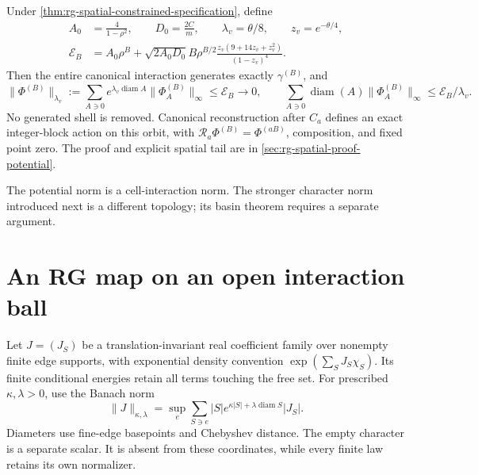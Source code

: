 Under \cref{thm:rg-spatial-constrained-specification}, define
\begin{equation}
 \begin{split}
 A_0&=\frac4{1-\rho^2},\qquad D_0=\frac{2C}{m},\qquad
 \lambda_v=\theta/8,\qquad z_v=e^{-\theta/4},\\
 \mathcal E_B&=A_0\rho^B+\sqrt{2A_0D_0}B\rho^{B/2}
 \frac{z_v(9+14z_v+z_v^2)}{(1-z_v)^4}.
 \end{split}
 \label{eq:rg-spatial-vacuum-bound}
\end{equation}
Then the entire canonical interaction generates exactly
\(\gamma^{(B)}\), and
\begin{equation}
 \|\Phi^{(B)}\|_{\lambda_v}
 :=\sum_{A\ni0}e^{\lambda_v\operatorname{diam}A}
                   \|\Phi_A^{(B)}\|_\infty
 \le\mathcal E_B\longrightarrow0,
 \qquad
 \sum_{A\ni0}\operatorname{diam}(A)\|\Phi_A^{(B)}\|_\infty
 \le\mathcal E_B/\lambda_v.
 \label{eq:rg-spatial-vacuum-norm}
\end{equation}
No generated shell is removed. Canonical reconstruction after \(C_a\) defines
an exact integer-block action on this orbit, with
\(\mathcal R_a\Phi^{(B)}=\Phi^{(aB)}\), composition, and fixed point zero.
The proof and explicit spatial tail are in
\cref{sec:rg-spatial-proof-potential}. 

The potential norm is a cell-interaction norm. The stronger character norm introduced next
is a different topology; its basin theorem requires a separate argument.

\section{An RG map on an open interaction ball}
\label{sec:rg-spatial-open-ball}

Let \(J=(J_S)\) be a translation-invariant real coefficient family over
nonempty finite edge supports, with exponential density convention
\(\exp(\sum_SJ_S\chi_S)\). Its finite conditional energies retain all terms
touching the free set. For prescribed \(\kappa,\lambda>0\), use the Banach norm
\begin{equation}
 \|J\|_{\kappa,\lambda}
 =\sup_e\sum_{S\ni e}|S|e^{\kappa|S|+\lambda\operatorname{diam}S}|J_S|.
 \label{eq:rg-spatial-character-norm}
\end{equation}
Diameters use fine-edge basepoints and Chebyshev distance. The empty character
is a separate scalar. It is absent from these coordinates, while every
finite law retains its own normalizer. 

